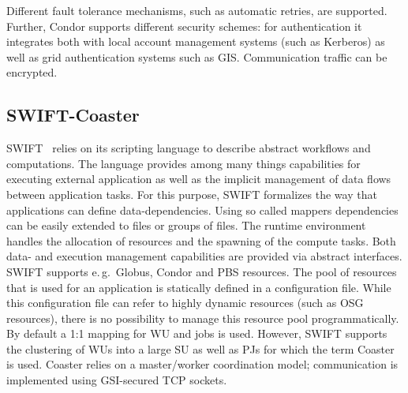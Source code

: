 \documentclass[conference,final]{IEEEtran}
\newcommand{\jhanote}[1]{ {\textcolor{red} { ***shantenu: #1 }}}
\newcommand{\alnote}[1]{ {\textcolor{blue} { ***andre: #1 }}}
\newcommand{\alnote}[1]{}
\newcommand{\jhanote}[1]{}
\newcommand{\upp}{\vspace*{-0.5em}}
\begin{document}
Different fault tolerance mechanisms, such as automatic retries, are supported.
Further, Condor supports different security schemes: for authentication it
integrates both with local account management systems (such as Kerberos) as well
as grid authentication systems such as GIS. Communication traffic can be
encrypted.



\subsection{SWIFT-Coaster\upp\upp}

SWIFT~\cite{Wilde2011} relies on its scripting language to describe abstract
workflows and computations. The language provides among many things capabilities
for executing external application as well as the implicit management of data
flows between application tasks. For this purpose, SWIFT formalizes the way that
applications can define data-dependencies. Using so called mappers dependencies
can be easily extended to files or groups of files. The runtime environment
handles the allocation of resources and the spawning of the compute tasks. Both
data- and execution management capabilities are provided via abstract
interfaces. SWIFT supports e.\,g.\ Globus, Condor and PBS resources. The pool of
resources that is used for an application is statically defined in a
configuration file. While this configuration file can refer to highly dynamic
resources (such as OSG resources), there is no possibility to manage this
resource pool programmatically. By default a 1:1 mapping for WU and jobs is
used. However, SWIFT supports the clustering of WUs into a large SU as
well as PJs for which the term Coaster~\cite{coasters} is used. Coaster
relies on a master/worker coordination model; communication is implemented using
GSI-secured TCP sockets.






\end{document}
